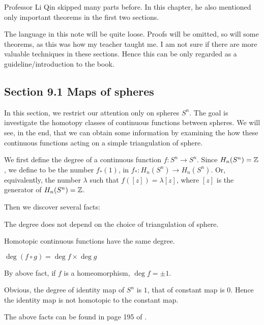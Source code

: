 
Professor Li Qin skipped many parts before. In this chapter, he also
mentioned only important theorems in the first two sections.

The language in this note will be quite loose. Proofs will be omitted,
so will some theorems, as this was how my teacher taught me. I am not
sure if there are more valuable techniques in these sections. Hence
this can be only regarded as a guideline/introduction to the book.

\subsection{Section 9.1 Maps of spheres}
\label{sec:Maps-of-spheres}

In this section, we restrict our attention only on spheres $S^n$. The
goal is investigate the homotopy classes of continuous functions
between spheres. We will see, in the end, that we can obtain some
information by examining the how these continuous functions acting on
a simple triangulation of sphere.

We first define the degree of a continuous function $f:S^n\to S^n$.
Since $H_n(S^n)=\mathbb{Z}$, we define  to be the number
$f_*(1)$, in $f_*:H_n(S^n)\to H_n(S^n)$. Or, equivalently, the number
$\lambda$ such that $f([z])=\lambda[z]$, where $[z]$ is the generator
of $H_n(S^n)=\mathbb{Z}$.

Then we discover several facts:
\begin{fact}
    The degree does not depend on the choice of triangulation of
    sphere.
\end{fact}
\begin{fact}
    Homotopic continuous functions have the same degree.
\end{fact}
\begin{fact}
    $\operatorname{deg}(f\circ g)=\operatorname{deg}f\times
    \operatorname{deg}g$
\end{fact}
\begin{fact}
    By above fact, if $f$ is a homeomorphism,
    $\operatorname{deg}f=\pm 1$.
\end{fact}
\begin{fact}
    Obvious, the degree of identity map of $S^n$ is $1$, that of
    constant map is $0$. Hence the identity map is not homotopic to
    the constant map.
\end{fact}

The above facts can be found in page 195 of \cite{book}.

